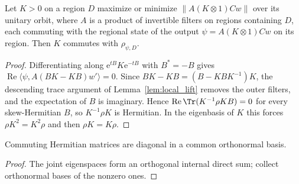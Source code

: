 \begin{lemma}
    \label{lem:filter_stationarity}
    \leanok
    Let $K>0$ on a region $D$ maximize or minimize $\lVert A(K\otimes1)Cw\rVert$ over its
    unitary orbit, where $A$ is a product of invertible filters on regions
    containing $D$, each commuting with the regional state of the output
    $\psi=A(K\otimes1)Cw$ on its region. Then $K$ commutes with $\rho_{\psi,D}$.
\end{lemma}
\begin{proof}\leanok
    Differentiating along $\mathrm e^{tB}K\mathrm e^{-tB}$ with $B^*=-B$ gives
    $\operatorname{Re}\langle\psi,A(BK-KB)w'\rangle=0$. Since
    $BK-KB=(B-KBK^{-1})K$, the descending trace argument of
    Lemma~\ref{lem:local_lift} removes the outer filters, and the expectation
    of $B$ is imaginary. Hence $\operatorname{Re}\Tr(K^{-1}\rho KB)=0$ for every
    skew-Hermitian $B$, so $K^{-1}\rho K$ is Hermitian. In the eigenbasis of
    $K$ this forces $\rho K^2=K^2\rho$ and then $\rho K=K\rho$.
\end{proof}

\begin{lemma}
    \label{lem:commuting_hermitian}
    \leanok
    Commuting Hermitian matrices are diagonal in a common orthonormal basis.
\end{lemma}
\begin{proof}\leanok
    The joint eigenspaces form an orthogonal internal direct sum; collect
    orthonormal bases of the nonzero ones.
\end{proof}

